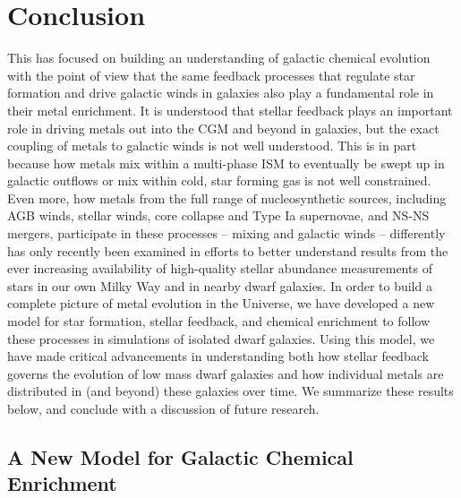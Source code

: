 \chapter[Conclusion]{Conclusion}
\label{ch:conclusion}


This \dissertation has focused on building an understanding of galactic chemical evolution with the point of view that the same feedback processes that regulate star formation and drive galactic winds in galaxies also play a fundamental role in their metal enrichment. It is understood that stellar feedback plays an important role in driving metals out into the CGM and beyond in galaxies, but the exact coupling of metals to galactic winds is not well understood. This is in part because how metals mix within a multi-phase ISM to eventually be swept up in galactic outflows or mix within cold, star forming gas is not well constrained. Even more, how metals from the full range of nucleosynthetic sources, including AGB winds, stellar winds, core collapse and Type Ia supernovae, and NS-NS mergers, participate in these processes -- mixing and galactic winds -- differently has only recently been examined in efforts to better understand results from the ever increasing availability of high-quality stellar abundance measurements of stars in our own Milky Way and in nearby dwarf galaxies. In order to build a complete picture of metal evolution in the Universe, we have developed a new model for star formation, stellar feedback, and chemical enrichment to follow these processes in simulations of isolated dwarf galaxies. Using this model, we have made critical advancements in understanding both how stellar feedback governs the evolution of low mass dwarf galaxies and how individual metals are distributed in (and beyond) these galaxies over time. We summarize these results below, and conclude with a discussion of future research.


\section{A New Model for Galactic Chemical Enrichment}
\label{conclusion:sec:ch1}

